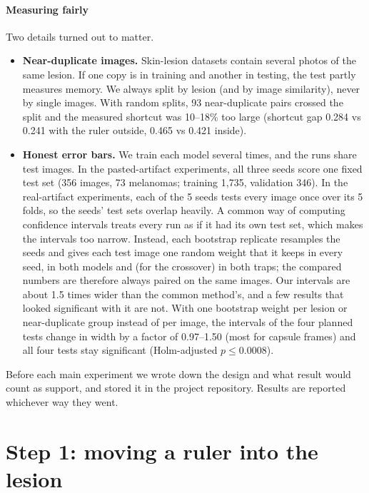 \documentclass[11pt,a4paper]{article}
\begin{document}
\paragraph{Measuring fairly} Two details turned out to matter.
\begin{itemize}[leftmargin=1.2em,itemsep=1pt,topsep=2pt]
\item \textbf{Near-duplicate images.} Skin-lesion datasets contain several photos of the same lesion. If one copy is in
training and another in testing, the test partly measures memory. We always split by lesion (and by image similarity),
never by single images. With random splits, 93 near-duplicate pairs crossed the split and the measured shortcut was
10--18\% too large (shortcut gap 0.284 vs 0.241 with the ruler outside, 0.465 vs 0.421 inside).
\item \textbf{Honest error bars.} We train each model several times, and the runs share test images. In the
pasted-artifact experiments, all three seeds score one fixed test set (356 images, 73 melanomas; training 1,735,
validation 346). In the real-artifact experiments, each of the 5 seeds tests every image once over its 5 folds, so the
seeds' test sets overlap heavily. A common way of computing confidence intervals treats every run as if it had its own
test set, which makes the intervals too narrow. Instead, each bootstrap replicate resamples the seeds and gives each
test image one random weight that it keeps in every seed, in both models and (for the crossover) in both traps; the
compared numbers are therefore always paired on the same images. Our intervals are about 1.5 times wider than the
common method's, and a few results that looked significant with it are not. With one bootstrap weight per lesion or
near-duplicate group instead of per image, the intervals of the four planned tests change in width by a factor of
0.97--1.50 (most for capsule frames) and all four tests stay significant (Holm-adjusted $p \le 0.0008$).
\end{itemize}
Before each main experiment we wrote down the design and what result would count as support, and stored it in the
project repository. Results are reported whichever way they went.



\section{Step 1: moving a ruler into the lesion}\label{sec:ruler}
\end{document}
